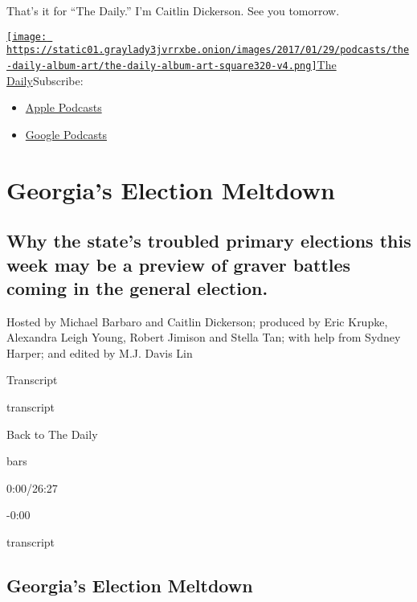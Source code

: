 That's it for ``The Daily.'' I'm Caitlin Dickerson. See you tomorrow.

\href{https://www.nytimes3xbfgragh.onion/column/the-daily}{\texttt{[image: https://static01.graylady3jvrrxbe.onion/images/2017/01/29/podcasts/the-daily-album-art/the-daily-album-art-square320-v4.png]}The
Daily}Subscribe:

\begin{itemize}
\tightlist
\item
  \href{https://itunes.apple.com/us/podcast/id1200361736}{Apple
  Podcasts}
\item
  \href{https://www.google.com/podcasts?feed=aHR0cHM6Ly9yc3MuYXJ0MTkuY29tL3RoZS1kYWlseQ\%3D\%3D}{Google
  Podcasts}
\end{itemize}

\hypertarget{georgias-election-meltdown-1}{%
\section{Georgia's Election
Meltdown}\label{georgias-election-meltdown-1}}

\hypertarget{why-the-states-troubled-primary-elections-this-week-may-be-a-preview-of-graver-battles-coming-in-the-general-election-1}{%
\subsection{Why the state's troubled primary elections this week may be
a preview of graver battles coming in the general
election.}\label{why-the-states-troubled-primary-elections-this-week-may-be-a-preview-of-graver-battles-coming-in-the-general-election-1}}

Hosted by Michael Barbaro and Caitlin Dickerson; produced by Eric
Krupke, Alexandra Leigh Young, Robert Jimison and Stella Tan; with help
from Sydney Harper; and edited by M.J. Davis Lin

Transcript

transcript

Back to The Daily

bars

0:00/26:27

-0:00

transcript

\hypertarget{georgias-election-meltdown-2}{%
\subsection{Georgia's Election
Meltdown}\label{georgias-election-meltdown-2}}

